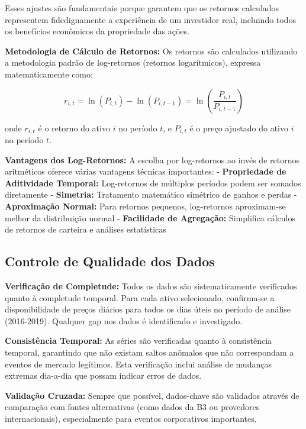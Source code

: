 Esses ajustes são fundamentais porque garantem que os retornos calculados representem fidedignamente a experiência de um investidor real, incluindo todos os benefícios econômicos da propriedade das ações.

\textbf{Metodologia de Cálculo de Retornos:} Os retornos são calculados utilizando a metodologia padrão de log-retornos (retornos logarítmicos), expressa matematicamente como:

\begin{equation}
r_{i,t} = \ln(P_{i,t}) - \ln(P_{i,t-1}) = \ln\left(\frac{P_{i,t}}{P_{i,t-1}}\right)
\end{equation}

onde $r_{i,t}$ é o retorno do ativo $i$ no período $t$, e $P_{i,t}$ é o preço ajustado do ativo $i$ no período $t$.

\textbf{Vantagens dos Log-Retornos:} A escolha por log-retornos ao invés de retornos aritméticos oferece várias vantagens técnicas importantes:
- \textbf{Propriedade de Aditividade Temporal:} Log-retornos de múltiplos períodos podem ser somados diretamente
- \textbf{Simetria:} Tratamento matemático simétrico de ganhos e perdas
- \textbf{Aproximação Normal:} Para retornos pequenos, log-retornos aproximam-se melhor da distribuição normal
- \textbf{Facilidade de Agregação:} Simplifica cálculos de retornos de carteira e análises estatísticas

\subsection{Controle de Qualidade dos Dados}

\textbf{Verificação de Completude:} Todos os dados são sistematicamente verificados quanto à completude temporal. Para cada ativo selecionado, confirma-se a disponibilidade de preços diários para todos os dias úteis no período de análise (2016-2019). Qualquer gap nos dados é identificado e investigado.

\textbf{Consistência Temporal:} As séries são verificadas quanto à consistência temporal, garantindo que não existam saltos anômalos que não correspondam a eventos de mercado legítimos. Esta verificação inclui análise de mudanças extremas dia-a-dia que possam indicar erros de dados.

\textbf{Validação Cruzada:} Sempre que possível, dados-chave são validados através de comparação com fontes alternativas (como dados da B3 ou provedores internacionais), especialmente para eventos corporativos importantes.

